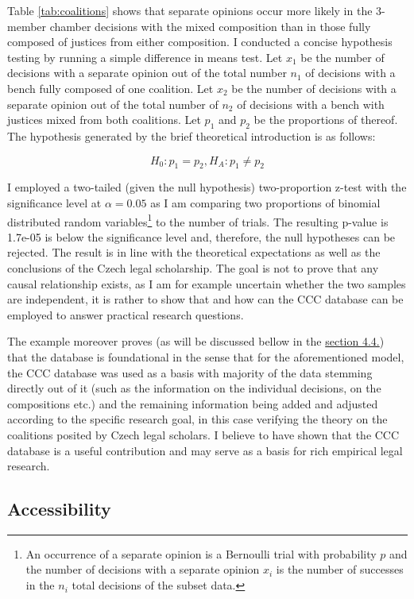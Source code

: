 \documentclass[
  11pt,
]{article}
\begin{document}
Table \ref{tab:coalitions} shows that separate opinions occur more likely in the 3-member chamber decisions with the mixed composition than in those fully composed of justices from either composition. I conducted a concise hypothesis testing by running a simple difference in means test. Let \(x_1\) be the number of decisions with a separate opinion out of the total number \(n_1\) of decisions with a bench fully composed of one coalition. Let \(x_2\) be the number of decisions with a separate opinion out of the total number of \(n_2\) of decisions with a bench with justices mixed from both coalitions. Let \(p_1\) and \(p_2\) be the proportions of thereof. The hypothesis generated by the brief theoretical introduction is as follows:

\[H_0: p_1 = p_2, H_A: p_1 \neq p_2\]

I employed a two-tailed (given the null hypothesis) two-proportion z-test with the significance level at \(\alpha = 0.05\) as I am comparing two proportions of binomial distributed random variables\footnote{An occurrence of a separate opinion is a Bernoulli trial with probability \(p\) and the number of decisions with a separate opinion \(x_i\) is the number of successes in the \(n_i\) total decisions of the subset data.} to the number of trials. The resulting p-value is 1.7e-05 is below the significance level and, therefore, the null hypotheses can be rejected. The result is in line with the theoretical expectations as well as the conclusions of the Czech legal scholarship. The goal is not to prove that any causal relationship exists, as I am for example uncertain whether the two samples are independent, it is rather to show that and how can the CCC database can be employed to answer practical research questions.

The example moreover proves (as will be discussed bellow in the \hyperref[foundational]{section 4.4.}) that the database is foundational in the sense that for the aforementioned model, the CCC database was used as a basis with majority of the data stemming directly out of it (such as the information on the individual decisions, on the compositions etc.) and the remaining information being added and adjusted according to the specific research goal, in this case verifying the theory on the coalitions posited by Czech legal scholars. I believe to have shown that the CCC database is a useful contribution and may serve as a basis for rich empirical legal research.

\subsection{Accessibility}\label{accessibility}
\end{document}
